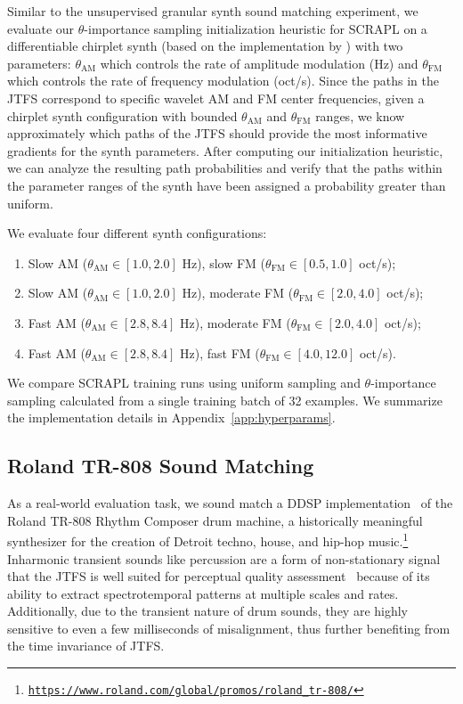 \documentclass{article} %
\theoremstyle{plain}
\theoremstyle{definition}
\theoremstyle{remark}
\begin{document}
Similar to the unsupervised granular synth sound matching experiment, we evaluate our $\theta$-importance sampling initialization heuristic for SCRAPL on a differentiable chirplet synth (based on the implementation by \cite{vahidi2023mesostructures}) with two parameters: $\theta_{\mathrm{AM}}$ which controls the rate of amplitude modulation (Hz) and $\theta_{\mathrm{FM}}$ which controls the rate of frequency modulation (oct/s).
Since the paths in the JTFS correspond to specific wavelet AM and FM center frequencies, given a chirplet synth configuration with bounded $\theta_{\mathrm{AM}}$ and $\theta_{\mathrm{FM}}$ ranges, we know approximately which paths of the JTFS should provide the most informative gradients for the synth parameters.
After computing our initialization heuristic, we can analyze the resulting path probabilities and verify that the paths within the parameter ranges of the synth have been assigned a probability greater than uniform.

We evaluate four different synth configurations: 
\begin{enumerate}
    \item Slow AM ($\theta_{\mathrm{AM}} \in [1.0, 2.0]$ Hz), slow FM ($\theta_{\mathrm{FM}} \in [0.5, 1.0]$ oct/s);
    \item Slow AM ($\theta_{\mathrm{AM}} \in [1.0, 2.0]$ Hz), moderate FM ($\theta_{\mathrm{FM}} \in [2.0, 4.0]$ oct/s);
    \item Fast AM ($\theta_{\mathrm{AM}} \in [2.8, 8.4]$ Hz), moderate FM ($\theta_{\mathrm{FM}} \in [2.0, 4.0]$ oct/s);
    \item Fast AM ($\theta_{\mathrm{AM}} \in [2.8, 8.4]$ Hz), fast FM ($\theta_{\mathrm{FM}} \in [4.0, 12.0]$ oct/s).
\end{enumerate}
We compare SCRAPL training runs using uniform sampling and $\theta$-importance sampling calculated from a single training batch of 32 examples.
We summarize the implementation details in Appendix~\ref{app:hyperparams}.


\subsection{Roland TR-808 Sound Matching}
\label{ssec:exp_808}
\vspace{-5pt}

As a real-world evaluation task, we sound match a DDSP implementation~\citep{shier2024realtime} of the Roland TR-808 Rhythm Composer drum machine, a historically meaningful synthesizer for the creation of Detroit techno, house, and hip-hop music.\footnote{\texttt{\url{https://www.roland.com/global/promos/roland_tr-808/}}} 
Inharmonic transient sounds like percussion are a form of non-stationary signal that the JTFS is well suited for perceptual quality assessment~\citep{han2024learning} because of its ability to extract spectrotemporal patterns at multiple scales and rates.
Additionally, due to the transient nature of drum sounds, they are highly sensitive to even a few milliseconds of misalignment, thus further benefiting from the time invariance of JTFS.
\end{document}
